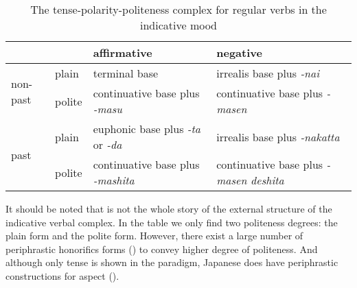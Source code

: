 \documentclass[UTF8, a4paper, oneside, scheme=plain]{ctexrep}
\newcommand{\corpus}[1]{\emph{#1}}
\begin{document}
\begin{table}[H]
    \caption{The tense-polarity-politeness complex for regular verbs in the indicative mood}
    \label{tbl:tense-polarity-politeness}
    \begin{tabular}{llll}
        \toprule
        &                            & affirmative                                                       & negative                                                          \\
                              \midrule
    \multirow{2}{*}{non-past} & plain                      & terminal base                                                     & irrealis base plus \corpus{-nai}                                   \\
                              & polite                     & continuative base plus \corpus{-masu}                              & continuative base plus \corpus{-masen}                             \\ \midrule
    \multirow{2}{*}{past}     & \multicolumn{1}{l}{plain}  & \multicolumn{1}{l}{euphonic base plus \corpus{-ta} or \corpus{-da}} & \multicolumn{1}{l}{irrealis base plus \corpus{-nakatta}}           \\
                              & \multicolumn{1}{l}{polite} & \multicolumn{1}{l}{continuative base plus \corpus{-mashita}}       & \multicolumn{1}{l}{continuative base plus \corpus{-masen deshita}} \\
                              \bottomrule
    \end{tabular}
\end{table}

It should be noted that  is not the whole story 
of the external structure of the indicative verbal complex.
In the table we only find two politeness degrees:
the plain form and the polite form.
However, there exist a large number of periphrastic honorifics forms 
()
to convey higher degree of politeness.
And although only tense is shown in the paradigm,
Japanese does have periphrastic constructions for aspect ().
\end{document}
